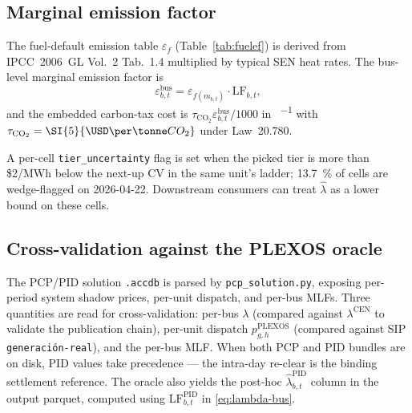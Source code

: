 \subsection{Marginal emission factor}
\label{sec:eps}

The fuel-default emission table $\varepsilon_f$
(Table~\ref{tab:fuelef}) is derived from IPCC~2006~GL Vol.~2 Tab.~1.4
multiplied by typical SEN heat rates.  The bus-level marginal
emission factor is
\begin{equation}
\varepsilon^{\mathrm{bus}}_{b,t} = \varepsilon_{f(m_{b,t})}
                                   \cdot \mathrm{LF}_{b,t},
\label{eq:eps-bus}
\end{equation}
and the embedded carbon-tax cost is
$\tau_{\mathrm{CO}_2}\varepsilon^{\mathrm{bus}}_{b,t}/1000$ in
\si{\USD\per\MWh} with $\tau_{\mathrm{CO}_2}=\SI{5}{\USD\per\tonne CO_2}$
under Law~20.780.

\begin{table}[t]
  \centering
  \caption{Fuel-default emission factors $\varepsilon_f$
  (\si{\kg{}_2\per\MWh}).  IPCC 2006 GL Vol.~2 Tab.~1.4 ×
  typical SEN heat rates; biomass and biogas are biogenic-zero.}
  \label{tab:fuelef}
  
\end{table}

A per-cell \texttt{tier\_uncertainty} flag is set when the picked
tier is more than \$2/MWh below the next-up CV in the same unit's
ladder; \SI{13.7}{\percent} of cells are wedge-flagged on
2026-04-22.  Downstream consumers can treat $\hat\lambda$ as a lower
bound on these cells.

\subsection{Cross-validation against the PLEXOS oracle}
\label{sec:oracle}

The PCP/PID solution \texttt{.accdb} is parsed by
\texttt{pcp\_solution.py}, exposing per-period system shadow prices,
per-unit dispatch, and per-bus MLFs.  Three quantities are read for
cross-validation: per-bus $\lambda$ (compared against
$\lambda^{\mathrm{CEN}}$ to validate the publication chain), per-unit
dispatch $p_{g,h}^{\mathrm{PLEXOS}}$ (compared against SIP
\texttt{generaci\'on-real}), and the per-bus MLF.  When both PCP and
PID bundles are on disk, PID values take precedence — the intra-day
re-clear is the binding settlement reference.  The oracle also yields
the post-hoc $\hat\lambda^{\mathrm{PID}}_{b,t}$ column in the output
parquet, computed using $\mathrm{LF}^{\mathrm{PID}}_{b,t}$ in
\eqref{eq:lambda-bus}.
